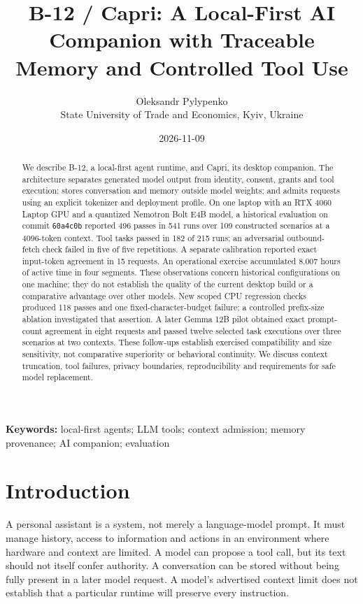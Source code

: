 \documentclass[11pt,a4paper]{article}
\title{B-12 / Capri: A Local-First AI Companion with Traceable Memory and Controlled Tool Use}
\author{Oleksandr Pylypenko\\[4pt]\small State University of Trade and Economics, Kyiv, Ukraine}
\date{2026-11-09}
\begin{document}
\sloppy
\maketitle
\begin{abstract}
We describe B-12, a local-first agent runtime, and Capri, its desktop companion. The architecture separates generated model output from identity, consent, grants and tool execution; stores conversation and memory outside model weights; and admits requests using an explicit tokenizer and deployment profile. On one laptop with an RTX 4060 Laptop GPU and a quantized Nemotron Bolt E4B model, a historical evaluation on commit \texttt{60a4c0b} reported 496 passes in 541 runs over 109 constructed scenarios at a 4096-token context. Tool tasks passed in 182 of 215 runs; an adversarial outbound-fetch check failed in five of five repetitions. A separate calibration reported exact input-token agreement in 15 requests. An operational exercise accumulated 8.007 hours of active time in four segments. These observations concern historical configurations on one machine; they do not establish the quality of the current desktop build or a comparative advantage over other models. New scoped CPU regression checks produced 118 passes and one fixed-character-budget failure; a controlled prefix-size ablation investigated that assertion. A later Gemma 12B pilot obtained exact prompt-count agreement in eight requests and passed twelve selected task executions over three scenarios at two contexts. These follow-ups establish exercised compatibility and size sensitivity, not comparative superiority or behavioral continuity. We discuss context truncation, tool failures, privacy boundaries, reproducibility and requirements for safe model replacement.
\end{abstract}
\noindent\textbf{Keywords:} local-first agents; LLM tools; context admission; memory provenance; AI companion; evaluation

\section{Introduction}
A personal assistant is a system, not merely a language-model prompt. It must manage history, access to information and actions in an environment where hardware and context are limited. A model can propose a tool call, but its text should not itself confer authority. A conversation can be stored without being fully present in a later model request. A model's advertised context limit does not establish that a particular runtime will preserve every instruction.
\end{document}
